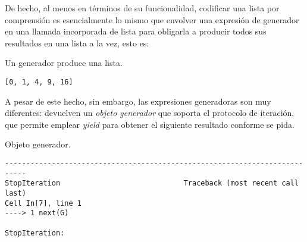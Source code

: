 De hecho, al menos en términos de su funcionalidad, codificar una lista
por comprensión es esencialmente lo mismo que envolver una expresión de
generador en una llamada incorporada de lista para obligarla a producir
todos sus resultados en una lista a la vez, esto es:\\

\begin{code} Un generador produce una lista.

\begin{Shaded}
\begin{Highlighting}[]
\OperatorTok{**}  \NormalTok{(}\NormalTok{))}
\end{Highlighting}
\end{Shaded}

\begin{verbatim}
[0, 1, 4, 9, 16]

\end{verbatim}
\end{code}

A pesar de este hecho, sin embargo, las expresiones generadoras son muy
diferentes: devuelven un \emph{objeto generador} que soporta el
protocolo de iteración, que permite emplear \emph{yield} para obtener el
siguiente resultado conforme se pida.\\

\begin{code} Objeto generador.

\begin{Shaded}
\begin{Highlighting}[]
\OperatorTok{=}\OperatorTok{**}  \NormalTok{(}\NormalTok{))}
\end{Highlighting}
\end{Shaded}

\begin{Shaded}
\begin{Highlighting}[]
\end{Highlighting}
\end{Shaded}

\begin{verbatim}
---------------------------------------------------------------------------
StopIteration                             Traceback (most recent call last)
Cell In[7], line 1
----> 1 next(G)

StopIteration: 

\end{verbatim}
\end{code}

